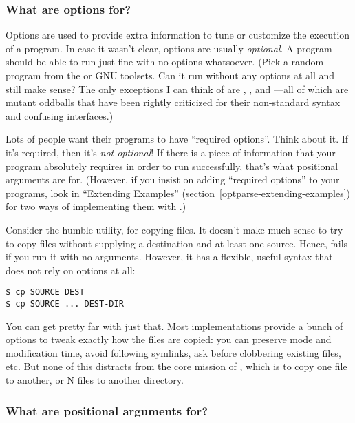 \subsubsection{What are options for?\label{optparse-options}}

Options are used to provide extra information to tune or customize the
execution of a program.  In case it wasn't clear, options are usually
\emph{optional}.  A program should be able to run just fine with no
options whatsoever.  (Pick a random program from the \UNIX{} or GNU
toolsets.  Can it run without any options at all and still make sense?
The only exceptions I can think of are , ,
and ---all of which are mutant oddballs that have been
rightly criticized for their non-standard syntax and confusing
interfaces.)

Lots of people want their programs to have ``required options''.
Think about it.  If it's required, then it's \emph{not optional}!  If
there is a piece of information that your program absolutely requires
in order to run successfully, that's what positional arguments are
for.  (However, if you insist on adding ``required options'' to your
programs, look in ``Extending Examples''
(section~\ref{optparse-extending-examples}) for two ways of
implementing them with .)

Consider the humble  utility, for copying files.  It
doesn't make much sense to try to copy files without supplying a
destination and at least one source.  Hence,  fails if you
run it with no arguments.  However, it has a flexible, useful syntax
that does not rely on options at all:

\begin{verbatim}
$ cp SOURCE DEST
$ cp SOURCE ... DEST-DIR
\end{verbatim}

You can get pretty far with just that.  Most 
implementations provide a bunch of options to tweak exactly how the
files are copied: you can preserve mode and modification time, avoid
following symlinks, ask before clobbering existing files, etc.  But
none of this distracts from the core mission of , which is
to copy one file to another, or N files to another directory.

\subsubsection{What are positional arguments for? \label{optparse-positional-arguments}}

